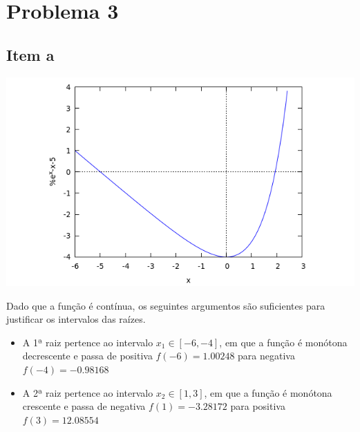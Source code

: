 {\section{Problema 3}
\subsection{Item a}

\begin{center} \includegraphics[scale=0.5]{2017E_3_1} \end{center}
Dado que a função é contínua, os seguintes argumentos são suficientes para justificar os intervalos das raízes.
\begin{itemize}
    \item A 1ª raiz pertence ao intervalo $x_1 \in [-6,-4]$, em que a função é monótona decrescente e passa de positiva $f(-6)=1.00248$ para negativa $f(-4)=-0.98168$
    \item A 2ª raiz pertence ao intervalo $x_2 \in [1,3]$, em que a função é monótona crescente e passa de negativa $f(1)=-3.28172$ para positiva $f(3)=12.08554$
\end{itemize}

}

